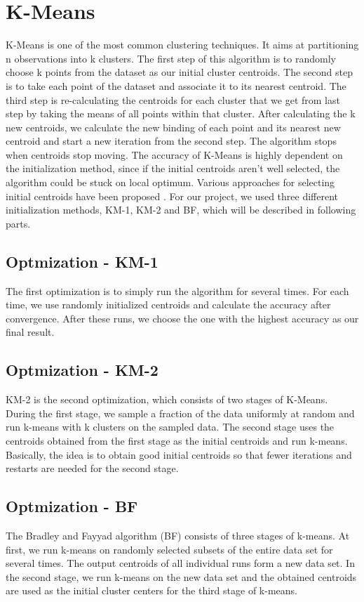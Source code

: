 \documentclass{acm_proc_article-sp}
\begin{document}
\section{K-Means}
K-Means is one of the most common clustering techniques. It aims at partitioning n observations into k clusters. The first step of this algorithm is to randomly choose k points from the dataset as our initial cluster centroids. The second step is to take each point of the dataset and associate it to its nearest centroid. The third step is re-calculating the centroids for each cluster that we get from last step by taking the means of all points within that cluster. After calculating the k new centroids, we calculate the new binding of each point and its nearest new centroid and start a new iteration from the second step. The algorithm stops when centroids stop moving.
The accuracy of K-Means is highly dependent on the initialization method, since if the initial centroids aren’t well selected, the algorithm could be stuck on local optimum. Various approaches for selecting initial centroids have been proposed \cite{kanungo2002efficient, arthur2007k, khan2004cluster}. For our project, we used three different initialization methods, KM-1\cite{hartigan1979algorithm}, KM-2 and BF, which will be described in following parts.

\subsection{Optmization - KM-1}
The first optimization is to simply run the algorithm for several times. For each time, we use randomly initialized centroids and calculate the accuracy after convergence. After these runs, we choose the one with the highest accuracy as our final result.
\subsection{Optmization - KM-2}
KM-2 is the second optimization, which consists of two stages of K-Means. During the first stage, we sample a fraction of the data uniformly at random and run k-means with k clusters on the sampled data. The second stage uses the centroids obtained from the first stage as the initial centroids and run k-means. Basically, the idea is to obtain good initial centroids so that fewer iterations and restarts are needed for the second stage.
\subsection{Optmization - BF}
The Bradley and Fayyad algorithm (BF) consists of three stages of k-means. At first, we run k-means on randomly selected subsets of the entire data set for several times. The output centroids of all individual runs form a new data set. In the second stage, we run k-means on the new data set and the obtained centroids are used as the initial cluster centers for the third stage of k-means.
\end{document}

